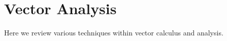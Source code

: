 \newpage
\chapter{Vector Analysis}
\label{app:vec-analysis}
Here we review various techniques within vector calculus and analysis.

